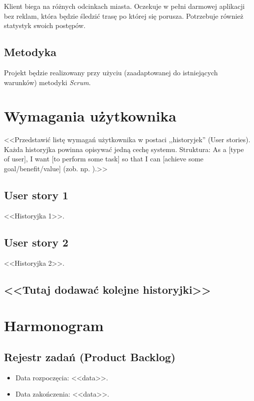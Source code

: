 \documentclass[a4paper]{article}
\begin{document}
Klient biega na różnych odcinkach miasta. Oczekuje w pełni darmowej aplikacji bez reklam, która będzie śledzić trasę po której się porusza. Potrzebuje również statystyk swoich postępów.

\subsection{Metodyka}

Projekt będzie realizowany przy użyciu (zaadaptowanej do istniejących warunków) metodyki {\em Scrum}.

\section{Wymagania użytkownika}
<<Przedstawić listę wymagań użytkownika w postaci ,,historyjek'' (User stories). Każda historyjka powinna opisywać jedną cechę systemu. Struktura: As a [type of user], I want [to perform some task] so that I can [achieve some goal/benefit/value] (zob. np. \cite{us}).>>

\subsection{User story 1}
<<Historyjka 1>>.

\subsection{User story 2}
<<Historyjka 2>>.

\subsection*{<<Tutaj dodawać kolejne historyjki>>}

\section{Harmonogram}

\subsection{Rejestr zadań (Product Backlog)}

\begin{itemize}
\item Data rozpoczęcia: <<data>>.
\item  Data zakończenia: <<data>>.
\end{itemize}
\end{document}
